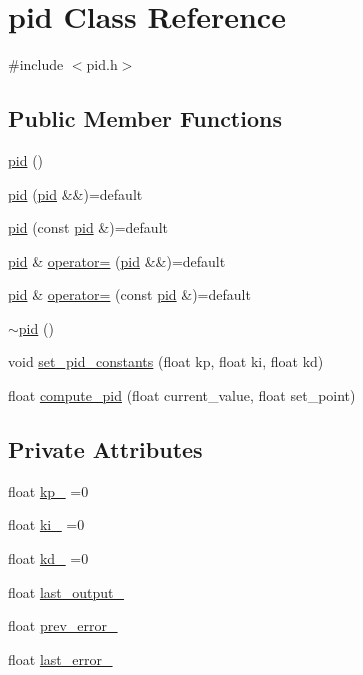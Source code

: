 \hypertarget{classpid}{}\section{pid Class Reference}
\label{classpid}


{\ttfamily \#include $<$pid.\+h$>$}

\subsection*{Public Member Functions}
\begin{DoxyCompactItemize}
\item 
\mbox{\hyperlink{classpid_a8cb9ff8fa0e7162d275990d01fb1588d}{pid}} ()
\item 
\mbox{\hyperlink{classpid_a6f1ee24f4f71509c5deb1c0ad0055570}{pid}} (\mbox{\hyperlink{classpid}{pid}} \&\&)=default
\item 
\mbox{\hyperlink{classpid_a9575073392a8eacc4e22035f5150b5ea}{pid}} (const \mbox{\hyperlink{classpid}{pid}} \&)=default
\item 
\mbox{\hyperlink{classpid}{pid}} \& \mbox{\hyperlink{classpid_af7488e0c71d01d1811d79ccc14d88bbf}{operator=}} (\mbox{\hyperlink{classpid}{pid}} \&\&)=default
\item 
\mbox{\hyperlink{classpid}{pid}} \& \mbox{\hyperlink{classpid_ab3bc80b44e04ee45b20138cd54c59e36}{operator=}} (const \mbox{\hyperlink{classpid}{pid}} \&)=default
\item 
\mbox{\hyperlink{classpid_a39baf63336fc6012bd640a6a8d0c5d6a}{$\sim$pid}} ()
\item 
void \mbox{\hyperlink{classpid_a345ce01f84470d635660b342770dce7c}{set\+\_\+pid\+\_\+constants}} (float kp, float ki, float kd)
\item 
float \mbox{\hyperlink{classpid_a59fcf15bc84320b81a0641e806e9f435}{compute\+\_\+pid}} (float current\+\_\+value, float set\+\_\+point)
\end{DoxyCompactItemize}
\subsection*{Private Attributes}
\begin{DoxyCompactItemize}
\item 
float \mbox{\hyperlink{classpid_a3d8bf85356ae8164ce6cf67cd012a637}{kp\+\_\+}} =0
\item 
float \mbox{\hyperlink{classpid_ae9f9e01cc473eb37061384afdc313249}{ki\+\_\+}} =0
\item 
float \mbox{\hyperlink{classpid_a93f4eff0b2d9700c609af887553e0d6a}{kd\+\_\+}} =0
\item 
float \mbox{\hyperlink{classpid_ae4599d4ab41474f8606a7c4e661b369f}{last\+\_\+output\+\_\+}}
\item 
float \mbox{\hyperlink{classpid_a5d0151f1efff3c3963068809c3f92fbc}{prev\+\_\+error\+\_\+}}
\item 
float \mbox{\hyperlink{classpid_a2d3bd1202a5869a7c16fca68e22bd045}{last\+\_\+error\+\_\+}}
\end{DoxyCompactItemize}


